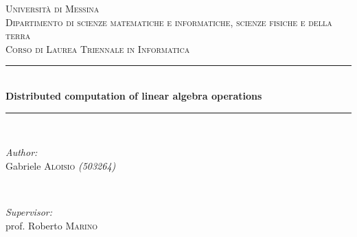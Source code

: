 \lstset{style=mystyle}


\begin{titlepage}

\newcommand{\HRule}{\rule{\linewidth}{0.5mm}} %

\center %
 

\textsc{\LARGE Università di Messina}\\[1.5cm] %
\textsc{\Large Dipartimento di scienze matematiche e informatiche, scienze fisiche e della terra}\\[0.5cm] %
\textsc{\large Corso di Laurea Triennale in Informatica}\\[0.5cm] %


\HRule \\[0.4cm]
{ \huge \bfseries Distributed computation of linear algebra operations}\\[0.4cm] %
\HRule \\[1.5cm]
 

\begin{minipage}{0.4\textwidth}
\begin{flushleft} \large
\emph{Author:}\\
Gabriele \textsc{Aloisio} \textit{(503264)} \\
\end{flushleft}
\end{minipage}
~
\begin{minipage}{0.4\textwidth}
\begin{flushright} \large
\emph{Supervisor:} \\
prof. Roberto \textsc{Marino} \\
\end{flushright}
\end{minipage}\\[2cm]


\end{titlepage}

